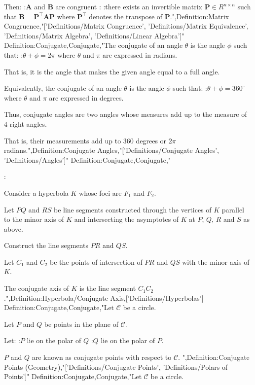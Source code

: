 Then:
:$\mathbf A$ and $\mathbf B$ are congruent
:
:there exists an invertible matrix $\mathbf P \in R^{n \times n}$ such that $\mathbf B = \mathbf P^\intercal \mathbf A \mathbf P$
where $\mathbf P^\intercal$ denotes the transpose of $\mathbf P$.",Definition:Matrix Congruence,"['Definitions/Matrix Congruence', 'Definitions/Matrix Equivalence', 'Definitions/Matrix Algebra', 'Definitions/Linear Algebra']"
Definition:Conjugate,Conjugate,"The conjugate of an angle $\theta$ is the angle $\phi$ such that:
:$\theta + \phi = 2 \pi$
where $\theta$ and $\pi$ are expressed in radians.

That is, it is the angle that makes the given angle equal to a full angle.


Equivalently, the conjugate of an angle $\theta$ is the angle $\phi$ such that:
:$\theta + \phi = 360 ^\circ$
where $\theta$ and $\pi$ are expressed in degrees.


Thus, conjugate angles are two angles whose measures add up to the measure of $4$ right angles.

That is, their measurements add up to $360$ degrees or $2 \pi$ radians.",Definition:Conjugate Angles,"['Definitions/Conjugate Angles', 'Definitions/Angles']"
Definition:Conjugate,Conjugate," 

:


Consider a hyperbola $K$ whose foci are $F_1$ and $F_2$.


Let $PQ$ and $RS$ be line segments constructed through the vertices of $K$ parallel to the minor axis of $K$ and intersecting the asymptotes of $K$ at $P$, $Q$, $R$ and $S$ as above.

Construct the line segments $PR$ and $QS$.

Let $C_1$ and $C_2$ be the points of intersection of $PR$ and $QS$ with the minor axis of $K$.


The conjugate axis of $K$ is the line segment $C_1 C_2$.",Definition:Hyperbola/Conjugate Axis,['Definitions/Hyperbolas']
Definition:Conjugate,Conjugate,"Let $\mathcal C$ be a circle.

Let $P$ and $Q$ be points in the plane of $\mathcal C$.

Let:
:$P$ lie on the polar of $Q$
:$Q$ lie on the polar of $P$.


$P$ and $Q$ are known as conjugate points with respect to $\mathcal C$.
",Definition:Conjugate Points (Geometry),"['Definitions/Conjugate Points', 'Definitions/Polars of Points']"
Definition:Conjugate,Conjugate,"Let $\mathcal C$ be a circle.

